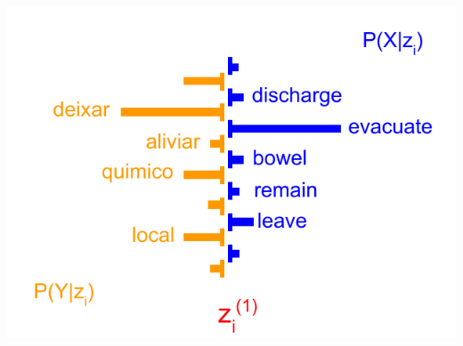 {\begin{textblock*}{0.45\textwidth}
{	\includegraphics[scale=0.6]{img/cmp/y1}
	}
	\end{textblock*}
	
}
